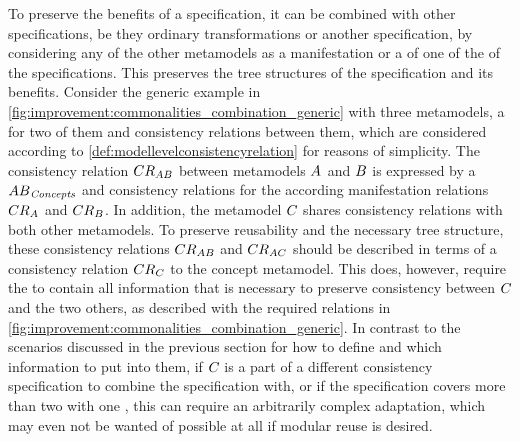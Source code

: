 To preserve the benefits of a \commonalities specification, it can be combined with other specifications, be they ordinary transformations or another \commonalities specification, by considering any of the other metamodels as a manifestation or a \conceptmetamodel of one of the \conceptmetamodels of the \commonalities specifications.
This preserves the tree structures of the \commonalities specification and its benefits.
Consider the generic example in \autoref{fig:improvement:commonalities_combination_generic} with three metamodels, a \conceptmetamodel for two of them and consistency relations between them, which are considered \modellevelconsistencyrelations according to \autoref{def:modellevelconsistencyrelation} for reasons of simplicity.
The consistency relation $\consistencyrelation{CR}{AB}$ between metamodels $\metamodel{A}{}$ and $\metamodel{B}{}$ is expressed by a \conceptmetamodel $\metamodel{AB}{\mathvariable{Concepts}}$ and consistency relations for the according manifestation relations $\consistencyrelation{CR}{A}$ and $\consistencyrelation{CR}{B}$.
In addition, the metamodel $\metamodel{C}{}$ shares consistency relations with both other metamodels.
To preserve reusability and the necessary tree structure, these consistency relations $\consistencyrelation{CR}{AB}$ and $\consistencyrelation{CR}{AC}$ should be described in terms of a consistency relation $\consistencyrelation{CR}{C}$ to the concept metamodel.
This does, however, require the \conceptmetamodel to contain all information that is necessary to preserve consistency between $\metamodel{C}{}$ and the two others, as described with the required relations in \autoref{fig:improvement:commonalities_combination_generic}.
In contrast to the scenarios discussed in the previous section for how to define \conceptmetamodels and which information to put into them, if $\metamodel{C}{}$ is a part of a different consistency specification to combine the \commonalities specification with, or if the \commonalities specification covers more than two \concretemetamodels with one \conceptmetamodel, this can require an arbitrarily complex adaptation, which may even not be wanted of possible at all if modular reuse is desired.

